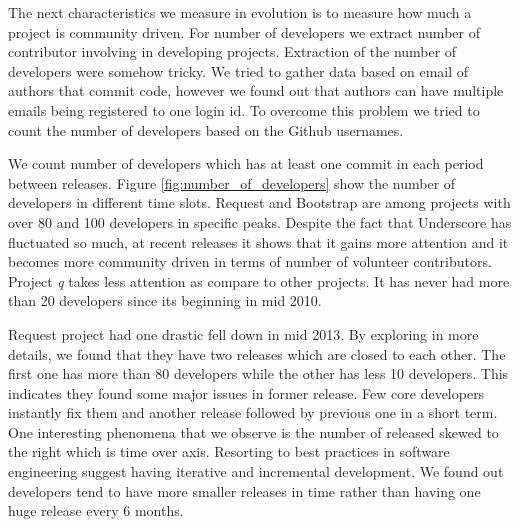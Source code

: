 



\vspace{3 mm}
\noindent{\rqiii}
\vspace{3 mm}

\par
The next characteristics we measure in evolution is to measure how much a project is community driven.
For number of developers we extract number of contributor involving in developing projects. Extraction of the number of developers were somehow tricky. We tried to gather data based on email of authors that commit code, however we found out that authors can have multiple emails being registered to one login id. To overcome this problem we tried to count the number of developers based on the Github usernames. 
\par
 We count number of developers which has at least one commit in each period between releases. Figure \ref{fig:number_of_developers} show the number of developers in different time slots. Request and Bootstrap are among projects with over 80 and 100 developers in specific peaks. Despite the fact that Underscore has fluctuated so much, at recent releases it shows that it gains more attention and it becomes more community driven in terms of number of volunteer contributors. Project \textit{q} takes less attention as compare to other projects. It has never had more than 20 developers since its beginning in mid 2010.
\par
Request project had one drastic fell down in mid 2013. By exploring in more details, we found that they have two releases which are closed to each other. The first one has more than 80 developers while the other has less 10 developers. This indicates they found some major issues in former release. Few core developers instantly fix them and another release followed by previous one in a short term. One interesting phenomena that we observe is the number of released skewed to the right which is time over  axis. Resorting to best practices in software engineering suggest having iterative and incremental development. We found out developers tend to have more smaller releases in time rather than having one huge release every 6 months.  


